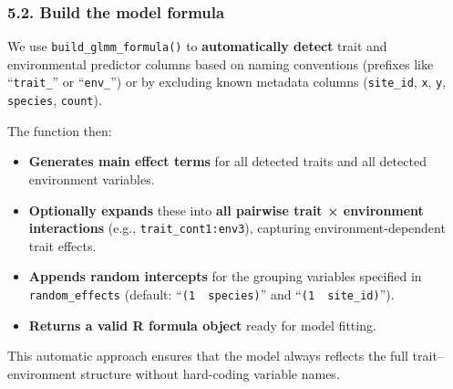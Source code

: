 \documentclass[
]{article}
\providecommand{\tightlist}{%
  \setlength{\itemsep}{0pt}\setlength{\parskip}{0pt}}
\begin{document}
\hypertarget{build-the-model-formula}{%
\subsubsection{5.2. Build the model
formula}\label{build-the-model-formula}}

We use \texttt{build\_glmm\_formula()} to \textbf{automatically detect}
trait and environmental predictor columns based on naming conventions
(prefixes like ``\texttt{trait\_}'' or ``\texttt{env\_}'') or by
excluding known metadata columns (\texttt{site\_id}, \texttt{x},
\texttt{y}, \texttt{species}, \texttt{count}).

The function then:

\begin{itemize}
\tightlist
\item
  \textbf{Generates main effect terms} for all detected traits and all
  detected environment variables.
\item
  \textbf{Optionally expands} these into \textbf{all pairwise trait ×
  environment interactions} (e.g., \texttt{trait\_cont1:env3}),
  capturing environment-dependent trait effects.
\item
  \textbf{Appends random intercepts} for the grouping variables
  specified in \texttt{random\_effects} (default:
  ``\texttt{(1\ \textbar{}\ species)}'' and
  ``\texttt{(1\ \textbar{}\ site\_id)}'').
\item
  \textbf{Returns a valid R formula object} ready for model fitting.
\end{itemize}

This automatic approach ensures that the model always reflects the full
trait--environment structure without hard-coding variable names.
\end{document}

